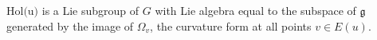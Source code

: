 \begin{theorem}\label{ambrosesinger}
$\text{Hol(u)}$ is a Lie subgroup of $G$ with Lie algebra equal to the subspace of $\mathfrak{g}$ generated by the image of $\Omega_v$, the curvature form at all points $v\in E(u)$.
\end{theorem}


